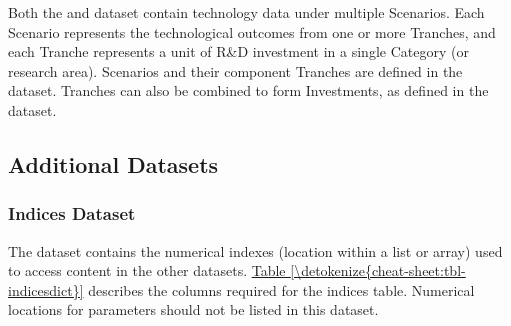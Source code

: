 \documentclass[letterpaper,10pt,english]{sphinxmanual}
\begin{document}
\sphinxAtStartPar
{} Both the  and  dataset contain technology data under multiple Scenarios. Each Scenario represents the technological outcomes from one or more Tranches, and each Tranche represents a unit of R\&D investment in a single Category (or research area). Scenarios and their component Tranches are defined in the  dataset. Tranches can also be combined to form Investments, as defined in the  dataset.


\subsection{Additional Datasets}
\label{\detokenize{cheat-sheet:additional-datasets}}

\subsubsection{Indices Dataset}
\label{\detokenize{cheat-sheet:indices-dataset}}
\sphinxAtStartPar
The  dataset contains the numerical indexes (location within a list or array) used to access content in the other datasets. \hyperref[\detokenize{cheat-sheet:tbl-indicesdict}]{Table \ref{\detokenize{cheat-sheet:tbl-indicesdict}}} describes the columns required for the indices table. Numerical locations for parameters should not be listed in this dataset.
\end{document}
